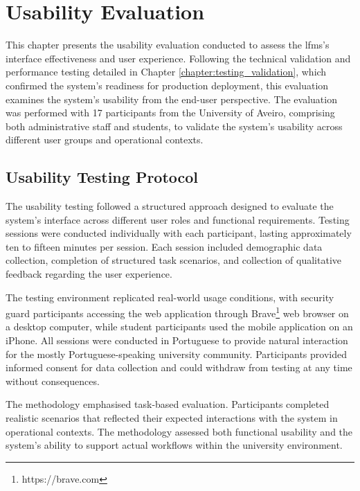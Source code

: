\chapter{Usability Evaluation}
\label{chapter:usability_evaluation}

This chapter presents the usability evaluation conducted to assess the \ac{lfms}'s interface effectiveness and user experience. Following the technical validation and performance testing detailed in Chapter \ref{chapter:testing_validation}, which confirmed the system's readiness for production deployment, this evaluation examines the system's usability from the end-user perspective. The evaluation was performed with 17 participants from the University of Aveiro, comprising both administrative staff and students, to validate the system's usability across different user groups and operational contexts.


\section{Usability Testing Protocol} \label{section:usability_protocol}

The usability testing followed a structured approach designed to evaluate the system's interface across different user roles and functional requirements. Testing sessions were conducted individually with each participant, lasting approximately ten to fifteen minutes per session. Each session included demographic data collection, completion of structured task scenarios, and collection of qualitative feedback regarding the user experience.

The testing environment replicated real-world usage conditions, with security guard participants accessing the web application through Brave\footnote{https://brave.com} web browser on a desktop computer, while student participants used the mobile application on an iPhone. All sessions were conducted in Portuguese to provide natural interaction for the mostly Portuguese-speaking university community. Participants provided informed consent for data collection and could withdraw from testing at any time without consequences.

The methodology emphasised task-based evaluation. Participants completed realistic scenarios that reflected their expected interactions with the system in operational contexts. The methodology assessed both functional usability and the system's ability to support actual workflows within the university environment.

